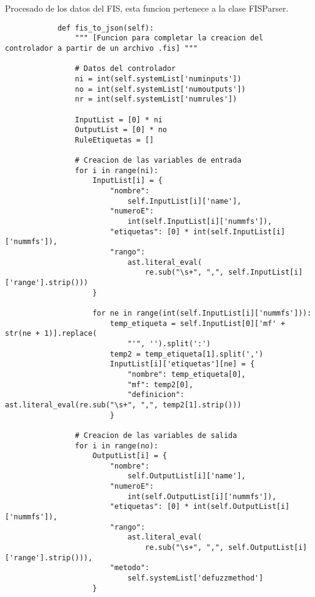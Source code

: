     \begin{longlisting}
        \caption[Procesado de los datos del FIS]{Procesado de los datos del FIS, esta funcion pertenece a la clase FISParser.}
        \label{code:anexoF2}				
        \begin{verbatim}
            def fis_to_json(self):
                """ [Funcion para completar la creacion del controlador a partir de un archivo .fis] """
                
                # Datos del controlador
                ni = int(self.systemList['numinputs'])
                no = int(self.systemList['numoutputs'])
                nr = int(self.systemList['numrules'])

                InputList = [0] * ni
                OutputList = [0] * no
                RuleEtiquetas = []

                # Creacion de las variables de entrada
                for i in range(ni):
                    InputList[i] = {
                        "nombre":
                            self.InputList[i]['name'],
                        "numeroE":
                            int(self.InputList[i]['nummfs']),
                        "etiquetas": [0] * int(self.InputList[i]['nummfs']),
                        "rango":
                            ast.literal_eval(
                                re.sub("\s+", ",", self.InputList[i]['range'].strip()))
                    }

                    for ne in range(int(self.InputList[i]['nummfs'])):
                        temp_etiqueta = self.InputList[0]['mf' + str(ne + 1)].replace(
                            "'", '').split(':')
                        temp2 = temp_etiqueta[1].split(',')
                        InputList[i]['etiquetas'][ne] = {
                            "nombre": temp_etiqueta[0],
                            "mf": temp2[0],
                            "definicion": ast.literal_eval(re.sub("\s+", ",", temp2[1].strip()))
                        }

                # Creacion de las variables de salida
                for i in range(no):
                    OutputList[i] = {
                        "nombre":
                            self.OutputList[i]['name'],
                        "numeroE":
                            int(self.OutputList[i]['nummfs']),
                        "etiquetas": [0] * int(self.OutputList[i]['nummfs']),
                        "rango":
                            ast.literal_eval(
                                re.sub("\s+", ",", self.OutputList[i]['range'].strip())),
                        "metodo":
                            self.systemList['defuzzmethod']
                    }


\end{verbatim}
\end{longlisting}

